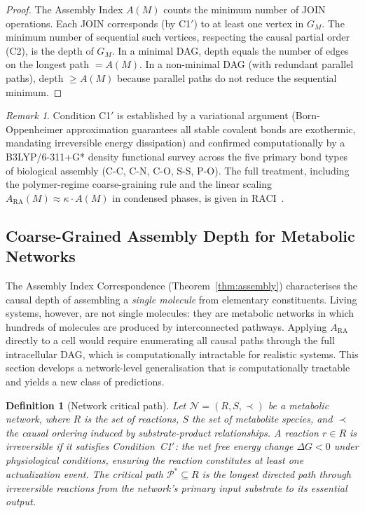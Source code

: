 \documentclass[11pt,a4paper]{article}
\newtheorem{definition}[theorem]{Definition}
\theoremstyle{remark}
\newtheorem{remark}[theorem]{Remark}
\newcommand{\GM}{G_{M}}
\newcommand{\ARA}{A_{\mathrm{RA}}}
\begin{document}
\begin{proof}
The Assembly Index $A(M)$ counts the minimum number of JOIN operations. Each
JOIN corresponds (by C1$'$) to at least one vertex in $\GM$. The minimum number of
sequential such vertices, respecting the causal partial order (C2), is the depth
of $\GM$. In a minimal DAG, depth equals the number of edges on the longest path
$= A(M)$. In a non-minimal DAG (with redundant parallel paths), depth $\geq A(M)$
because parallel paths do not reduce the sequential minimum.
\end{proof}

\begin{remark}
Condition C1$'$ is established by a variational argument (Born-Oppenheimer
approximation guarantees all stable covalent bonds are exothermic, mandating
irreversible energy dissipation) and confirmed computationally by a B3LYP/6-311+G*
density functional survey across the five primary bond types of biological assembly
(C-C, C-N, C-O, S-S, P-O). The full treatment, including the polymer-regime
coarse-graining rule and the linear scaling $\ARA(M) \approx \kappa \cdot A(M)$
in condensed phases, is given in RACI~\citep{Sandeman2026c}.
\end{remark}

\subsection{Coarse-Grained Assembly Depth for Metabolic Networks}
\label{sec:cgara}

The Assembly Index Correspondence (Theorem~\ref{thm:assembly}) characterises
the causal depth of assembling a \emph{single molecule} from elementary
constituents. Living systems, however, are not single molecules: they are
metabolic networks in which hundreds of molecules are produced by
interconnected pathways. Applying $\ARA$ directly to a cell would require
enumerating all causal paths through the full intracellular DAG, which is
computationally intractable for realistic systems. This section develops a
network-level generalisation that is computationally tractable and yields a
new class of predictions.

\begin{definition}[Network critical path]
\label{def:critical_path}
Let $\mathcal{N} = (R, S, \prec)$ be a metabolic network, where $R$ is the set
of reactions, $S$ the set of metabolite species, and $\prec$ the causal ordering
induced by substrate-product relationships. A reaction $r \in R$ is
\emph{irreversible} if it satisfies Condition~C1$'$: the net free energy change
$\Delta G < 0$ under physiological conditions, ensuring the reaction constitutes
at least one actualization event. The \emph{critical path}
$\mathcal{P}^* \subseteq R$ is the longest directed path through irreversible
reactions from the network's primary input substrate to its essential output.
\end{definition}
\end{document}
